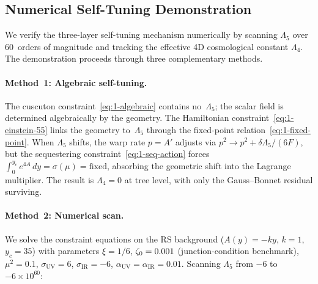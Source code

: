 \subsection{Numerical Self-Tuning Demonstration}
\label{sec:1-self-tuning-numerical}

We verify the three-layer self-tuning mechanism numerically by scanning $\Lambda_5$ over 60~orders of magnitude and tracking the effective 4D cosmological constant $\Lambda_4$. The demonstration proceeds through three complementary methods.

\paragraph{Method~1: Algebraic self-tuning.} The cuscuton constraint~\eqref{eq:1-algebraic} contains no~$\Lambda_5$; the scalar field is determined algebraically by the geometry. The Hamiltonian constraint~\eqref{eq:1-einstein-55} links the geometry to~$\Lambda_5$ through the fixed-point relation~\eqref{eq:1-fixed-point}. When $\Lambda_5$ shifts, the warp rate $p = A'$ adjusts via $p^2 \to p^2 + \delta\Lambda_5/(6F)$, but the sequestering constraint~\eqref{eq:1-seq-action} forces $\int_0^{y_c} e^{4A}\,dy = \sigma(\mu) = \mathrm{fixed}$, absorbing the geometric shift into the Lagrange multiplier. The result is $\Lambda_4 = 0$ at tree level, with only the Gauss--Bonnet residual surviving.

\paragraph{Method~2: Numerical scan.} We solve the constraint equations on the RS background ($A(y) = -ky$, $k = 1$, $y_c = 35$) with parameters $\xi = 1/6$, $\zeta_0 = 0.001$ (junction-condition benchmark), $\mu^2 = 0.1$, $\sigma_{\mathrm{UV}} = 6$, $\sigma_{\mathrm{IR}} = -6$, $\alpha_{\mathrm{UV}} = \alpha_{\mathrm{IR}} = 0.01$. Scanning $\Lambda_5$ from $-6$ to $-6 \times 10^{60}$:

